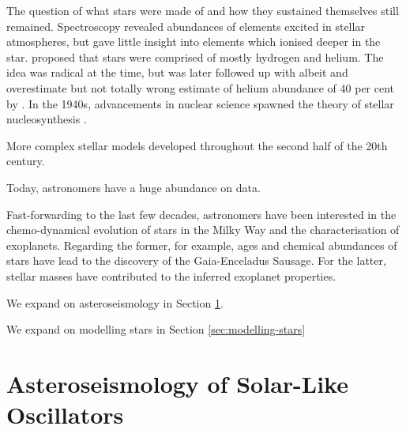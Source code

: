 
The question of what stars were made of and how they sustained themselves still remained. Spectroscopy revealed abundances of elements excited in stellar atmospheres, but gave little insight into elements which ionised deeper in the star. \citet{Payne1925} proposed that stars were comprised of mostly hydrogen and helium. The idea was radical at the time, but was later followed up with albeit and overestimate but not totally wrong estimate of helium abundance of 40 per cent by \citet{Schwarzschild1946}. In the 1940s, advancements in nuclear science spawned the theory of stellar nucleosynthesis \citep{Hoyle1946}.

More complex stellar models developed throughout the second half of the 20th century.

Today, astronomers have a huge abundance on data.

Fast-forwarding to the last few decades, astronomers have been interested in the chemo-dynamical evolution of stars in the Milky Way and the characterisation of exoplanets. Regarding the former, for example, ages and chemical abundances of stars have lead to the discovery of the Gaia-Enceladus Sausage. For the latter, stellar masses have contributed to the inferred exoplanet properties.

We expand on asteroseismology in Section \ref{sec:seismo}.

We expand on modelling stars in Section \ref{sec:modelling-stars}


\section[Solar-Like Oscillators]{Asteroseismology of Solar-Like Oscillators}\label{sec:seismo}

